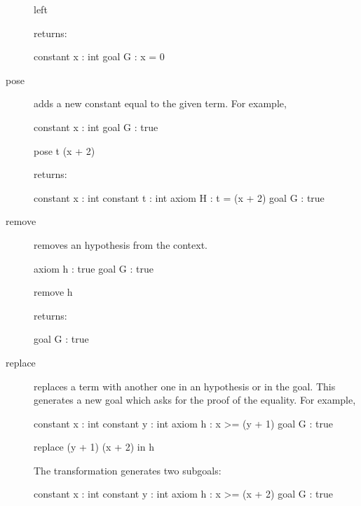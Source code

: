 \begin{description}
\begin{transwhy3}
left
\end{transwhy3}

returns:

\begin{whycode}
constant x : int
goal G : x = 0
\end{whycode}


\item[pose] adds a new constant equal to the given term.
  For example,
\begin{whycode}
constant x : int
goal G : true
\end{whycode}

\begin{transwhy3}
pose t (x + 2)
\end{transwhy3}

returns:
\begin{whycode}
constant x : int
constant t : int
axiom H : t = (x + 2)
goal G : true
\end{whycode}


\item[remove] removes an hypothesis from the context.

\begin{whycode}
axiom h : true
goal G : true
\end{whycode}

\begin{transwhy3}
remove h
\end{transwhy3}


returns:
\begin{whycode}
goal G : true
\end{whycode}


\item[replace] replaces a term with another one in an hypothesis or in the
  goal. This generates a new goal which asks for the proof of the equality.
  For example,
\begin{whycode}
constant x : int
constant y : int
axiom h : x >= (y + 1)
goal G : true
\end{whycode}

\begin{transwhy3}
replace (y + 1) (x + 2) in h
\end{transwhy3}

The transformation generates two subgoals:
\begin{whycode}
constant x : int
constant y : int
axiom h : x >= (x + 2)
goal G : true
\end{whycode}


\end{description}
